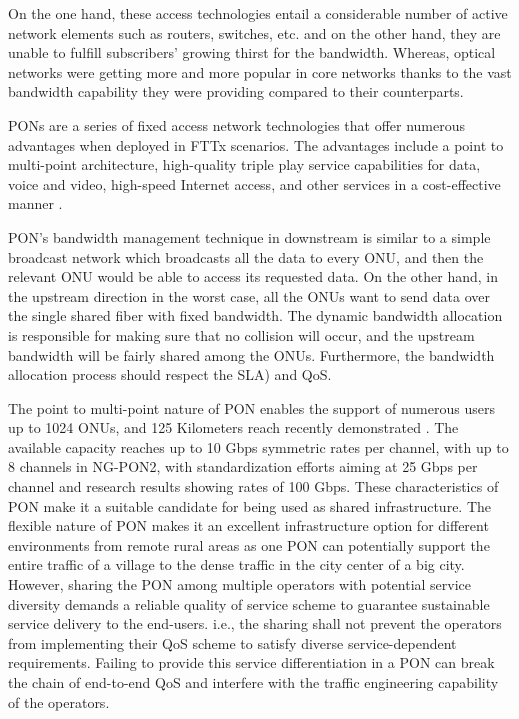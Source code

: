 On the one hand, these access technologies entail a considerable number of active network elements such as routers, switches, etc. and on the other hand, they are unable to fulfill subscribers' growing thirst for the bandwidth. Whereas, optical networks were getting more and more popular in core networks thanks to the vast bandwidth capability they were providing compared to their counterparts.

\acp{PON} are a series of fixed access network technologies that offer numerous advantages when deployed in \ac{FTTx} scenarios. The advantages include a point to multi-point architecture, high-quality triple play service capabilities for data, voice and video, high-speed Internet access, and other services in a cost-effective manner \cite{Abbas201653}.


\ac{PON}'s bandwidth management technique in downstream is similar to a simple broadcast network which broadcasts all the data to every \ac{ONU}, and then the relevant \ac{ONU} would be able to access its requested data. On the other hand, in the upstream direction in the worst case, all the \acp{ONU} want to send data over the single shared fiber with fixed bandwidth. The dynamic bandwidth allocation is responsible for making sure that no collision will occur, and the upstream bandwidth will be fairly shared among the \acp{ONU}. Furthermore, the bandwidth allocation process should respect the \ac{SLA}) and \ac{QoS}.

The point to multi-point nature of \ac{PON} enables the support of numerous users up to 1024 \acp{ONU}, and 125 Kilometers reach recently demonstrated \cite{7494070}. The available capacity reaches up to 10 Gbps symmetric rates per channel, with up to 8 channels in NG-PON2, with standardization efforts aiming at 25 Gbps per channel and research results showing rates of 100 Gbps. These characteristics of \ac{PON} make it a suitable candidate for being used as shared infrastructure. The flexible nature of \ac{PON} makes it an excellent infrastructure option for different environments from remote rural areas as one \ac{PON} can potentially support the entire traffic of a village to the dense traffic in the city center of a big city. However, sharing the \ac{PON} among multiple operators with potential service diversity demands a reliable quality of service scheme to guarantee sustainable service delivery to the end-users. i.e., the sharing shall not prevent the operators from implementing their \ac{QoS} scheme to satisfy diverse service-dependent requirements. Failing to provide this service differentiation in a \ac{PON} can break the chain of end-to-end \ac{QoS} and interfere with the traffic engineering capability of the operators.

